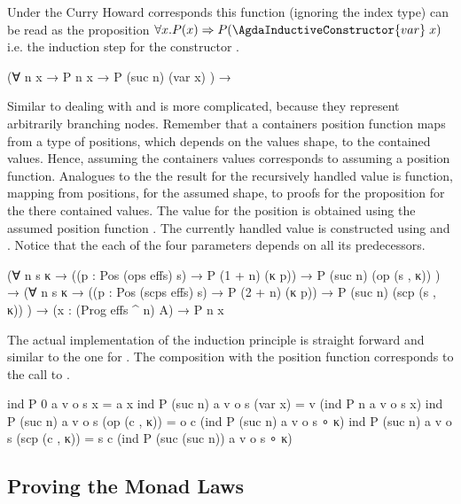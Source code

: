 Under the Curry Howard corresponds this function (ignoring the index type) can
be read as the proposition
$\forall x. P(x) \Rightarrow P(\AgdaInductiveConstructor{var}\;x)$
i.e. the induction step for the constructor .
\begin{AgdaAlign}
\begin{code}
  (∀ {n x}      → P n x                                                → P (suc n) (var x)         )  →
\end{code}
Similar to  dealing with  and
 is more complicated, because they represent
arbitrarily branching nodes.
Remember that a containers position function maps from a type of positions,
which depends on the values shape, to the contained values.
Hence, assuming the containers values corresponds to assuming a position
function.
Analogues to the  the result for the recursively handled value
is function, mapping from positions, for the assumed shape, to proofs for the
proposition for the there contained values.
The value for the position is obtained using the assumed position function
.
The currently handled value is constructed using  and  
.
Notice that the each of the four parameters depends on all its predecessors.
\begin{code}
  (∀ {n} s {κ}  → ((p : Pos (ops   effs) s) → P (1 + n)  (κ p))  → P (suc n) (op   (s , κ))  )  →
  (∀ {n} s {κ}  → ((p : Pos (scps  effs) s) → P (2 + n)  (κ p))  → P (suc n) (scp  (s , κ))  )  →
  (x : (Prog effs ^ n) A) → P n x
\end{code}
The actual implementation of the induction principle is straight forward and
similar to the one for .
The composition with the position function corresponds to the call to
.
\begin{code}
ind P 0       a v o s x               = a x
ind P (suc n) a v o s (var x)         = v    (ind P n              a v o s x)
ind P (suc n) a v o s (op   (c , κ))  = o c  (ind P (suc n)        a v o s ∘ κ)
ind P (suc n) a v o s (scp  (c , κ))  = s c  (ind P (suc (suc n))  a v o s ∘ κ)
\end{code}
\end{AgdaAlign}


\subsection{Proving the Monad Laws}
\label{scoped-algebra:monad-laws}

